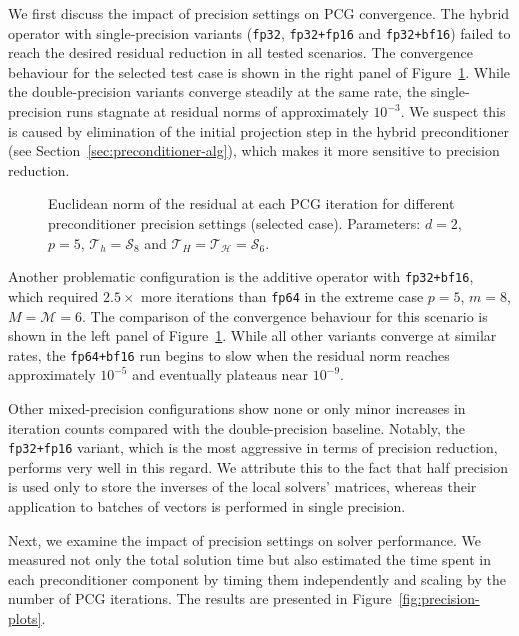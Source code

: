 \documentclass[11pt]{article}
\theoremstyle{definition}
\theoremstyle{theorem}
\begin{document}
We first discuss the impact of precision settings on PCG convergence.
The hybrid operator with single-precision variants
(\verb|fp32|, \verb|fp32+fp16| and \verb|fp32+bf16|) failed to reach the
desired residual reduction in all tested scenarios.
The convergence behaviour for the selected test case is shown in the right
panel of Figure~\ref{fig:precision-residuals}. While the
double-precision variants converge steadily at the same rate, the single-precision
runs stagnate at residual norms of approximately $10^{-3}$. We suspect
this is caused by elimination of the initial projection step in the hybrid
preconditioner (see Section~\ref{sec:preconditioner-alg}), which makes it
more sensitive to precision reduction.

\begin{figure}
  \centering
  
  \caption{Euclidean norm of the residual at each PCG iteration for different
  preconditioner precision settings (selected case). Parameters:
  $d=2$, $p=5$, $\mathcal{T}_h=\mathcal{S}_8$ and
  $\mathcal{T}_H=\mathcal{T}_\mathcal{H}=\mathcal{S}_6$.}
  \label{fig:precision-residuals}
\end{figure}

Another problematic configuration is the additive operator with \verb|fp32+bf16|,
which required $2.5\times$ more iterations than \verb|fp64| in the extreme case $p=5$,
$m=8$, $M=\mathcal{M}=6$. The comparison of the convergence behaviour for this
scenario is shown in the left panel of Figure~\ref{fig:precision-residuals}. While
all other variants converge at similar rates, the \verb|fp64+bf16| run begins
to slow when the residual norm reaches approximately $10^{-5}$ and eventually
plateaus near $10^{-9}$.

Other mixed-precision configurations show none or only minor increases in iteration
counts compared with the double-precision baseline. Notably, the
\verb|fp32+fp16| variant, which is the most aggressive in terms of precision reduction,
performs very well in this regard. We attribute this to the fact that
half precision is used only to store the inverses of the local solvers' matrices,
whereas their application to batches of vectors is performed in single precision.

Next, we examine the impact of precision settings on solver performance.
We measured not only the total solution time but also estimated the time spent
in each preconditioner component by timing them independently and scaling by the
number of PCG iterations. The results are presented in Figure~\ref{fig:precision-plots}.
\end{document}
